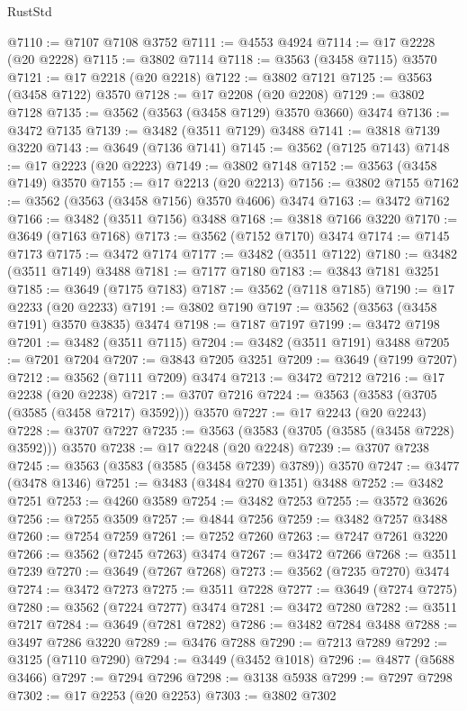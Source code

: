 \begin{lexlean}{RustStd}
\begin{coremodule}
@7110 := @7107 @7108 @3752
@7111 := @4553 @4924
@7114 := @17 @2228 (@20 @2228)
@7115 := @3802 @7114
@7118 := @3563 (@3458 @7115) @3570
@7121 := @17 @2218 (@20 @2218)
@7122 := @3802 @7121
@7125 := @3563 (@3458 @7122) @3570
@7128 := @17 @2208 (@20 @2208)
@7129 := @3802 @7128
@7135 := @3562 (@3563 (@3458 @7129) @3570 @3660) @3474
@7136 := @3472 @7135
@7139 := @3482 (@3511 @7129) @3488
@7141 := @3818 @7139 @3220
@7143 := @3649 (@7136 @7141)
@7145 := @3562 (@7125 @7143)
@7148 := @17 @2223 (@20 @2223)
@7149 := @3802 @7148
@7152 := @3563 (@3458 @7149) @3570
@7155 := @17 @2213 (@20 @2213)
@7156 := @3802 @7155
@7162 := @3562 (@3563 (@3458 @7156) @3570 @4606) @3474
@7163 := @3472 @7162
@7166 := @3482 (@3511 @7156) @3488
@7168 := @3818 @7166 @3220
@7170 := @3649 (@7163 @7168)
@7173 := @3562 (@7152 @7170) @3474
@7174 := @7145 @7173
@7175 := @3472 @7174
@7177 := @3482 (@3511 @7122)
@7180 := @3482 (@3511 @7149) @3488
@7181 := @7177 @7180
@7183 := @3843 @7181 @3251
@7185 := @3649 (@7175 @7183)
@7187 := @3562 (@7118 @7185)
@7190 := @17 @2233 (@20 @2233)
@7191 := @3802 @7190
@7197 := @3562 (@3563 (@3458 @7191) @3570 @3835) @3474
@7198 := @7187 @7197
@7199 := @3472 @7198
@7201 := @3482 (@3511 @7115)
@7204 := @3482 (@3511 @7191) @3488
@7205 := @7201 @7204
@7207 := @3843 @7205 @3251
@7209 := @3649 (@7199 @7207)
@7212 := @3562 (@7111 @7209) @3474
@7213 := @3472 @7212
@7216 := @17 @2238 (@20 @2238)
@7217 := @3707 @7216
@7224 := @3563 (@3583 (@3705 (@3585 (@3458 @7217) @3592))) @3570
@7227 := @17 @2243 (@20 @2243)
@7228 := @3707 @7227
@7235 := @3563 (@3583 (@3705 (@3585 (@3458 @7228) @3592))) @3570
@7238 := @17 @2248 (@20 @2248)
@7239 := @3707 @7238
@7245 := @3563 (@3583 (@3585 (@3458 @7239) @3789)) @3570
@7247 := @3477 (@3478 @1346)
@7251 := @3483 (@3484 @270 @1351) @3488
@7252 := @3482 @7251
@7253 := @4260 @3589
@7254 := @3482 @7253
@7255 := @3572 @3626
@7256 := @7255 @3509
@7257 := @4844 @7256
@7259 := @3482 @7257 @3488
@7260 := @7254 @7259
@7261 := @7252 @7260
@7263 := @7247 @7261 @3220
@7266 := @3562 (@7245 @7263) @3474
@7267 := @3472 @7266
@7268 := @3511 @7239
@7270 := @3649 (@7267 @7268)
@7273 := @3562 (@7235 @7270) @3474
@7274 := @3472 @7273
@7275 := @3511 @7228
@7277 := @3649 (@7274 @7275)
@7280 := @3562 (@7224 @7277) @3474
@7281 := @3472 @7280
@7282 := @3511 @7217
@7284 := @3649 (@7281 @7282)
@7286 := @3482 @7284 @3488
@7288 := @3497 @7286 @3220
@7289 := @3476 @7288
@7290 := @7213 @7289
@7292 := @3125 (@7110 @7290)
@7294 := @3449 (@3452 @1018)
@7296 := @4877 (@5688 @3466)
@7297 := @7294 @7296
@7298 := @3138 @5938
@7299 := @7297 @7298
@7302 := @17 @2253 (@20 @2253)
@7303 := @3802 @7302

\end{coremodule}
\end{lexlean}
